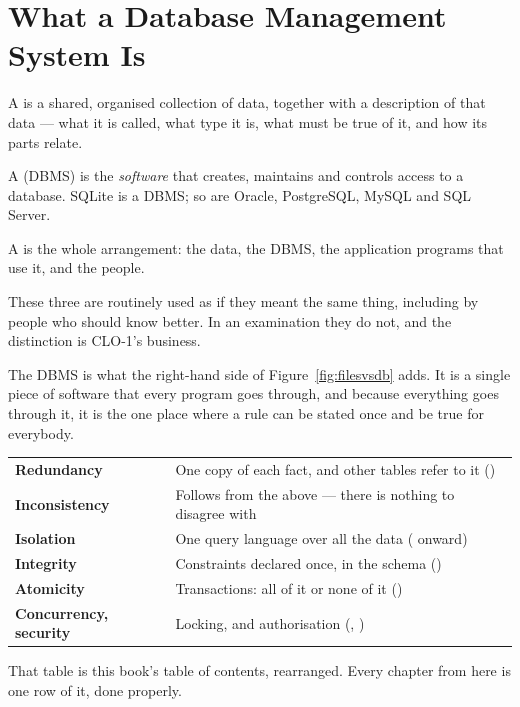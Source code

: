\section{What a Database Management System Is}

\begin{definitionbox}
A  is a shared, organised collection of data, together with a
description of that data --- what it is called, what type it is, what must be
true of it, and how its parts relate.

\smallskip
A  (DBMS) is the \emph{software} that creates,
maintains and controls access to a database. SQLite is a DBMS; so are Oracle,
PostgreSQL, MySQL and SQL Server.

\smallskip
A  is the whole arrangement: the data, the DBMS, the
application programs that use it, and the people.

\smallskip
These three are routinely used as if they meant the same thing, including by
people who should know better. In an examination they do not, and the
distinction is CLO-1's business.
\end{definitionbox}

The DBMS is what the right-hand side of Figure~\ref{fig:filesvsdb} adds. It is
a single piece of software that every program goes through, and because
everything goes through it, it is the one place where a rule can be stated once
and be true for everybody.

\begin{examplebox}
\begin{tabular}{@{}L{4.6cm}L{9.6cm}@{}}
\textbf{Redundancy} & One copy of each fact, and other tables refer to it
() \\
\textbf{Inconsistency} & Follows from the above --- there is nothing to
disagree with \\
\textbf{Isolation} & One query language over all the data (
onward) \\
\textbf{Integrity} & Constraints declared once, in the schema
() \\
\textbf{Atomicity} & Transactions: all of it or none of it
() \\
\textbf{Concurrency, security} & Locking, and authorisation
(, ) \\
\end{tabular}

\smallskip
That table is this book's table of contents, rearranged. Every chapter from
here is one row of it, done properly.
\end{examplebox}

